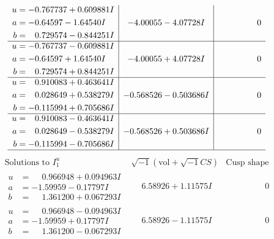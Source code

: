 \documentclass[1p]{elsarticle_modified}
\theoremstyle{definition}
\newcommand{\I}{\sqrt{-1}}
\begin{document}
$$\begin{array}{c|c|c}
\begin{aligned}
u &= -0.767737 + 0.609881 I \\
a &= -0.64597 - 1.64540 I \\
b &= \phantom{-}0.729574 - 0.844251 I\end{aligned}
 & -4.00055 - 4.07728 I & \phantom{-0.000000 } 0 \\ \hline\begin{aligned}
u &= -0.767737 - 0.609881 I \\
a &= -0.64597 + 1.64540 I \\
b &= \phantom{-}0.729574 + 0.844251 I\end{aligned}
 & -4.00055 + 4.07728 I & \phantom{-0.000000 } 0 \\ \hline\begin{aligned}
u &= \phantom{-}0.910083 + 0.463641 I \\
a &= \phantom{-}0.028649 + 0.538279 I \\
b &= -0.115994 + 0.705686 I\end{aligned}
 & -0.568526 - 0.503686 I & \phantom{-0.000000 } 0 \\ \hline\begin{aligned}
u &= \phantom{-}0.910083 - 0.463641 I \\
a &= \phantom{-}0.028649 - 0.538279 I \\
b &= -0.115994 - 0.705686 I\end{aligned}
 & -0.568526 + 0.503686 I & \phantom{-0.000000 } 0\\
 \hline 
 \end{array}$$\newpage$$\begin{array}{c|c|c}  
\text{Solutions to }I^u_{1}& \I (\text{vol} + \sqrt{-1}CS) & \text{Cusp shape}\\
 \hline 
\begin{aligned}
u &= \phantom{-}0.966948 + 0.094963 I \\
a &= -1.59959 - 0.17797 I \\
b &= \phantom{-}1.361200 + 0.067293 I\end{aligned}
 & \phantom{-}6.58926 + 1.11575 I & \phantom{-0.000000 } 0 \\ \hline\begin{aligned}
u &= \phantom{-}0.966948 - 0.094963 I \\
a &= -1.59959 + 0.17797 I \\
b &= \phantom{-}1.361200 - 0.067293 I\end{aligned}
 & \phantom{-}6.58926 - 1.11575 I & \phantom{-0.000000 } 0 \\ \hline\begin{aligned}

\end{aligned}
\end{array}$$
\end{document}
